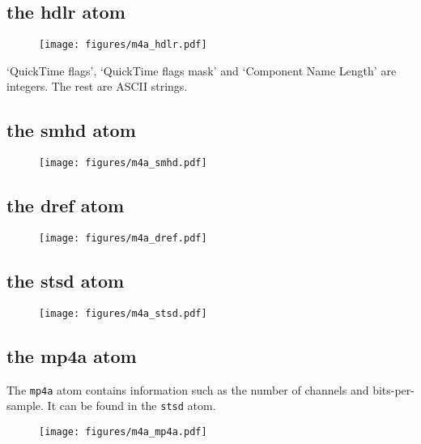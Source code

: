 \pagebreak

\subsection{the hdlr atom}

\begin{figure}[h]
\texttt{[image: figures/m4a\_hdlr.pdf]}
\end{figure}
\par
\noindent
`QuickTime flags', `QuickTime flags mask' and `Component Name Length'
are integers.  The rest are ASCII strings.

\subsection{the smhd atom}

\begin{figure}[h]
\texttt{[image: figures/m4a\_smhd.pdf]}
\end{figure}

\subsection{the dref atom}

\begin{figure}[h]
\texttt{[image: figures/m4a\_dref.pdf]}
\end{figure}

\pagebreak

\subsection{the stsd atom}

\begin{figure}[h]
\texttt{[image: figures/m4a\_stsd.pdf]}
\end{figure}

\subsection{the mp4a atom}

The \texttt{mp4a} atom contains information such as the number of channels
and bits-per-sample.  It can be found in the \texttt{stsd} atom.

\begin{figure}[h]
\texttt{[image: figures/m4a\_mp4a.pdf]}
\end{figure}

\pagebreak

